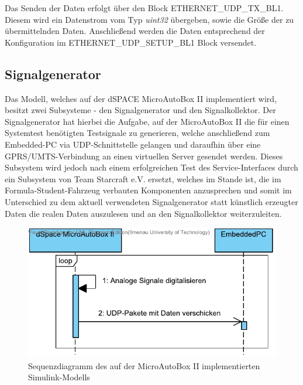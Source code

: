 \documentclass[fontsize = 12pt, paper = a4]{scrreprt}
\begin{document}
\begin{itemize}
Das Senden der Daten erfolgt über den Block ETHERNET\_UDP\_TX\_BL1. Diesem wird ein Datenstrom vom Typ \textit{uint32} übergeben, sowie die Größe der zu übermittelnden Daten. Anschließend werden die Daten entsprechend der Konfiguration im ETHERNET\_UDP\_SETUP\_BL1 Block versendet.



\end{itemize}

\subsection{Signalgenerator}

Das Modell, welches auf der dSPACE MicroAutoBox II implementiert wird, besitzt zwei Subsysteme - den Signalgenerator und den Signalkollektor. Der Signalgenerator hat hierbei die Aufgabe, auf der MicroAutoBox II die für einen Systemtest benötigten Testsignale zu generieren, welche anschließend zum Embedded-PC via UDP-Schnittstelle gelangen und daraufhin über eine GPRS/UMTS-Verbindung an einen virtuellen Server gesendet werden. Dieses Subsystem wird jedoch nach einem erfolgreichen Test des Service-Interfaces durch ein Subsystem von Team Starcraft e.V. ersetzt, welches im Stande ist, die im Formula-Student-Fahrzeug verbauten Komponenten anzusprechen und somit im Unterschied zu dem aktuell verwendeten Signalgenerator statt künstlich erzeugter Daten die realen Daten auszulesen und an den Signalkollektor weiterzuleiten. \vspace*{5mm}

\begin{figure}[h]
\centering
\includegraphics[scale = 1]{opt_autobox}
\caption{Sequenzdiagramm des auf der MicroAutoBox II implementierten Simulink-Modells}
\end{figure}
  
\end{document}
